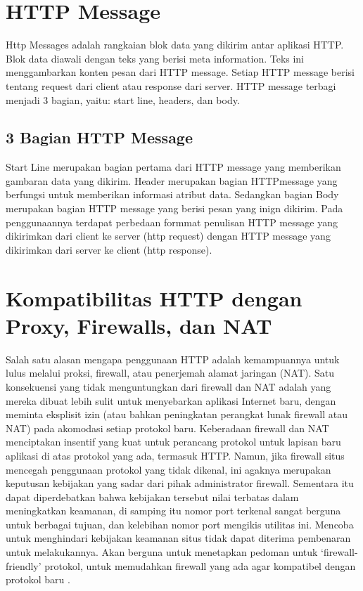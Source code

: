 \section{HTTP Message}
Http Messages adalah rangkaian blok data yang dikirim antar aplikasi HTTP. Blok data diawali dengan teks yang berisi meta information. Teks ini menggambarkan konten pesan dari HTTP message. Setiap HTTP message berisi tentang request dari client atau response dari server. HTTP message terbagi menjadi 3 bagian, yaitu: start line, headers, dan body\cite{hartono2013desain}.

\subsection{3 Bagian HTTP Message}
Start Line merupakan bagian pertama dari HTTP message yang memberikan gambaran data yang dikirim. Header merupakan bagian HTTPmessage yang berfungsi untuk memberikan informasi atribut data. Sedangkan bagian Body merupakan bagian HTTP message yang berisi pesan yang inign dikirim. Pada penggunaannya terdapat perbedaan formmat penulisan HTTP message yang dikirimkan dari client ke server (http request) dengan HTTP message yang dikirimkan dari server ke client (http response)\cite{hartono2013desain}.

\section{Kompatibilitas HTTP dengan Proxy, Firewalls, dan NAT}
Salah satu alasan mengapa penggunaan HTTP adalah kemampuannya untuk lulus melalui proksi, firewall, atau penerjemah alamat jaringan (NAT). Satu konsekuensi yang tidak menguntungkan dari firewall dan NAT adalah yang mereka dibuat lebih sulit untuk menyebarkan aplikasi Internet baru, dengan meminta eksplisit izin (atau bahkan peningkatan perangkat lunak firewall atau NAT) pada akomodasi setiap protokol baru. Keberadaan firewall dan NAT menciptakan insentif yang kuat untuk perancang protokol untuk lapisan baru aplikasi di atas protokol yang ada, termasuk HTTP. Namun, jika firewall situs mencegah penggunaan protokol yang tidak dikenal, ini agaknya merupakan keputusan kebijakan yang sadar dari pihak administrator firewall. Sementara itu dapat diperdebatkan bahwa kebijakan tersebut nilai terbatas dalam meningkatkan keamanan, di samping itu nomor port terkenal sangat berguna untuk berbagai tujuan, dan kelebihan nomor port mengikis utilitas ini. Mencoba untuk menghindari kebijakan keamanan situs tidak dapat diterima pembenaran untuk melakukannya. Akan berguna untuk menetapkan pedoman untuk `firewall-friendly' protokol, untuk memudahkan firewall yang ada agar kompatibel dengan protokol baru
\cite{moore2002use}.

